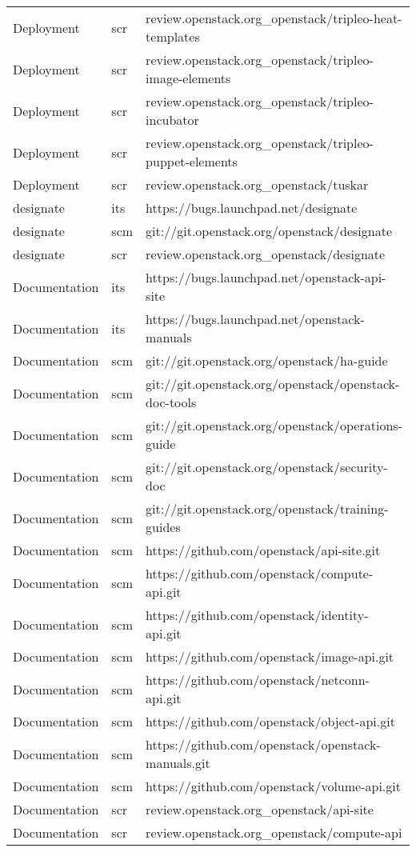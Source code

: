 \begin{center}
\begin{longtable}{|p{4cm}|p{1cm}|p{10cm}|}
Deployment&scr&review.openstack.org\_openstack/tripleo-heat-templates\\ 
Deployment&scr&review.openstack.org\_openstack/tripleo-image-elements\\ 
Deployment&scr&review.openstack.org\_openstack/tripleo-incubator\\ 
Deployment&scr&review.openstack.org\_openstack/tripleo-puppet-elements\\ 
Deployment&scr&review.openstack.org\_openstack/tuskar\\ 
designate&its&https://bugs.launchpad.net/designate\\ 
designate&scm&git://git.openstack.org/openstack/designate\\ 
designate&scr&review.openstack.org\_openstack/designate\\ 
Documentation&its&https://bugs.launchpad.net/openstack-api-site\\ 
Documentation&its&https://bugs.launchpad.net/openstack-manuals\\ 
Documentation&scm&git://git.openstack.org/openstack/ha-guide\\ 
Documentation&scm&git://git.openstack.org/openstack/openstack-doc-tools\\ 
Documentation&scm&git://git.openstack.org/openstack/operations-guide\\ 
Documentation&scm&git://git.openstack.org/openstack/security-doc\\ 
Documentation&scm&git://git.openstack.org/openstack/training-guides\\ 
Documentation&scm&https://github.com/openstack/api-site.git\\ 
Documentation&scm&https://github.com/openstack/compute-api.git\\ 
Documentation&scm&https://github.com/openstack/identity-api.git\\ 
Documentation&scm&https://github.com/openstack/image-api.git\\ 
Documentation&scm&https://github.com/openstack/netconn-api.git\\ 
Documentation&scm&https://github.com/openstack/object-api.git\\ 
Documentation&scm&https://github.com/openstack/openstack-manuals.git\\ 
Documentation&scm&https://github.com/openstack/volume-api.git\\ 
Documentation&scr&review.openstack.org\_openstack/api-site\\ 
Documentation&scr&review.openstack.org\_openstack/compute-api\\ 

\end{longtable}
\end{center}
